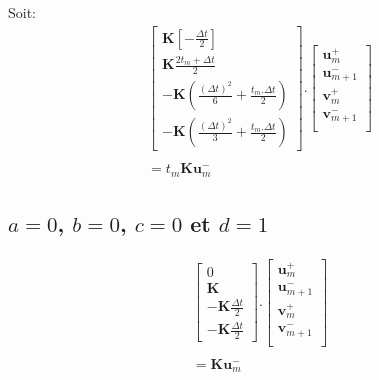 \documentclass[12pt,a4paper]{report}
\begin{document}
Soit:
\begin{equation}
\begin{array}{l }
	\begin{bmatrix}	   
		   \mathbf{K} \left[
			   - \frac{\Delta t}{2} 
			\right]
		\\   
		   \mathbf{K}
			   		\frac{2t_m + \Delta t}{2}
		\\   
		   -\mathbf{K}
		   		(\frac{(\Delta t)^2}{6} + \frac{t_m.\Delta t}{2})
		\\
		   -\mathbf{K}
		   		(\frac{(\Delta t)^2}{3} + \frac{t_m.\Delta t}{2})
	\end{bmatrix}
	.
	\begin{bmatrix}
		   \mathbf{u}_m^+  		\\
		   \mathbf{u}_{m+1}^-  	\\
		   \mathbf{v}_m^+  		\\
		   \mathbf{v}_{m+1}^-  	\\
	\end{bmatrix}
	\\
	\\
		= t_m \mathbf{K} \mathbf{u}_m^-
	
\end{array}
\end{equation}

\subsection{$a=0$, $b=0$, $c=0$ et $d=1$}
\begin{equation}
\begin{array}{l }
	\begin{bmatrix}	   
		   0
		\\   
		   \mathbf{K}
		\\   
		   -\mathbf{K} \frac{\Delta t}{2}
		\\   
		   -\mathbf{K} \frac{\Delta t}{2}
	\end{bmatrix}
	.
	\begin{bmatrix}
		   \mathbf{u}_m^+  		\\
		   \mathbf{u}_{m+1}^-  	\\
		   \mathbf{v}_m^+  		\\
		   \mathbf{v}_{m+1}^-  	\\
	\end{bmatrix}
	\\
	\\
		= \mathbf{K} \mathbf{u}_m^-
\end{array}
\end{equation}
\end{document}
